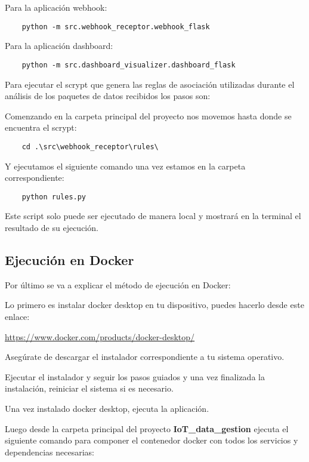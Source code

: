 Para la aplicación webhook:

\begin{verbatim}
    python -m src.webhook_receptor.webhook_flask
\end{verbatim}

Para la aplicación dashboard: 

\begin{verbatim}
    python -m src.dashboard_visualizer.dashboard_flask
\end{verbatim}

Para ejecutar el scrypt que genera las reglas de asociación utilizadas durante el análisis de los paquetes de datos recibidos los pasos son:

Comenzando en la carpeta principal del proyecto nos movemos hasta donde se encuentra el scrypt:
\begin{verbatim}
    cd .\src\webhook_receptor\rules\
\end{verbatim}

Y ejecutamos el siguiente comando una vez estamos en la carpeta correspondiente:
\begin{verbatim}
    python rules.py
\end{verbatim}

Este script solo puede ser ejecutado de manera local y mostrará en la terminal el resultado de su ejecución.

\label{ejec_docker}
\subsection{Ejecución en Docker}

Por último se va a explicar el método de ejecución en Docker:

Lo primero es instalar docker desktop en tu dispositivo, puedes hacerlo desde este enlace:

\href{https://www.docker.com/products/docker-desktop/}{https://www.docker.com/products/docker-desktop/}

Asegúrate de descargar el instalador correspondiente a tu sistema operativo.

Ejecutar el instalador y seguir los pasos guiados y una vez finalizada la instalación, reiniciar el sistema si es necesario.

Una vez instalado docker desktop, ejecuta la aplicación.

Luego desde la carpeta principal del proyecto \textbf{IoT\_data\_gestion} ejecuta el siguiente comando para componer el contenedor docker con todos los servicios y dependencias necesarias:

